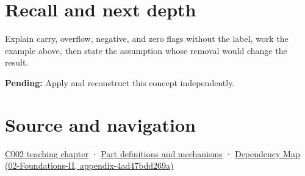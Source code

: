 \section{Recall and next depth}\label{appendix-8d687c9c08ab-recall-and-next-depth}

Explain carry, overflow, negative, and zero flags without the label, work the example above, then state the assumption whose removal would change the result.

\textbf{Pending:} Apply and reconstruct this concept independently.

\section{Source and navigation}\label{appendix-8d687c9c08ab-source-and-navigation}

\href{Continuous\%20Notes/Computing\%20Foundations\%20-\%20From\%20Bits\%20to\%20C++\%20and\%20Systems\%20APIs\#Arithmetic\%20becomes\%20a\%20policy}{C002 teaching chapter} · \hyperref[appendix-fd090d982a15]{Part definitions and mechanisms} · \href{../02-Foundations-II/main.pdf\#nameddest=appendix-4ad47bdd269a}{Dependency Map (02-Foundations-II, appendix-4ad47bdd269a)}

